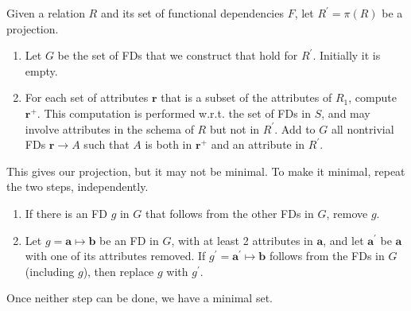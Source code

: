     \begin{theorem}
      Given a relation $R$ and its set of functional dependencies $F$, let $R^\prime = \pi(R)$ be a projection. 
      \begin{enumerate}
        \item Let $G$ be the set of FDs that we construct that hold for $R^\prime$. Initially it is empty. 
        \item For each set of attributes $\mathbf{r}$ that is a subset of the attributes of $R_1$, compute $\mathbf{r}^+$. This computation is performed w.r.t. the set of FDs in $S$, and may involve attributes in the schema of $R$ but not in $R^\prime$. Add to $G$ all nontrivial FDs $\mathbf{r} \rightarrow A$ such that $A$ is both in $\mathbf{r}^+$ and an attribute in $R^\prime$. 
      \end{enumerate}
      This gives our projection, but it may not be minimal. To make it minimal, repeat the two steps, independently. 
      \begin{enumerate}
        \item If there is an FD $g$ in $G$ that follows from the other FDs in $G$, remove $g$. 
        \item Let $g = \mathbf{a} \mapsto \mathbf{b} $ be an FD in $G$, with at least 2 attributes in $\mathbf{a}$, and let $\mathbf{a}^\prime$ be $\mathbf{a}$ with one of its attributes removed. If $g^\prime = \mathbf{a}^\prime \mapsto \mathbf{b}$ follows from the FDs in $G$ (including $g$), then replace $g$ with $g^\prime$. 
      \end{enumerate}
      Once neither step can be done, we have a minimal set. 
    \end{theorem}

